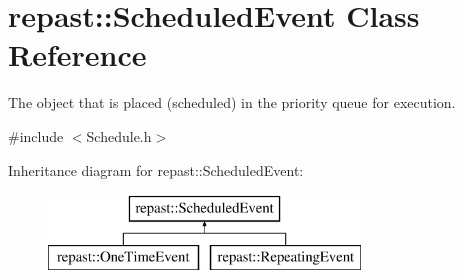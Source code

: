 \hypertarget{classrepast_1_1_scheduled_event}{\section{repast\-:\-:Scheduled\-Event Class Reference}
\label{classrepast_1_1_scheduled_event}
}


The object that is placed (scheduled) in the priority queue for execution.  




{\ttfamily \#include $<$Schedule.\-h$>$}

Inheritance diagram for repast\-:\-:Scheduled\-Event\-:\begin{figure}[H]
\begin{center}
\leavevmode
\includegraphics[height=2.000000cm]{classrepast_1_1_scheduled_event}
\end{center}
\end{figure}
